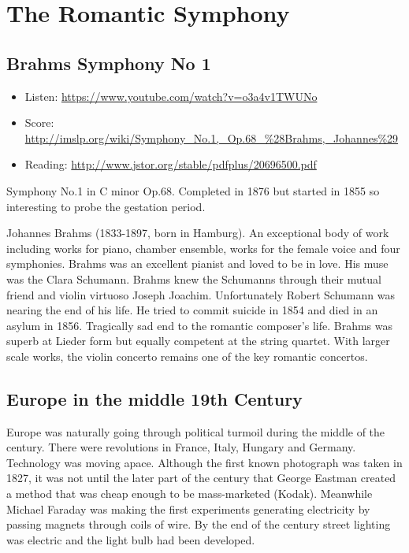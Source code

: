 
\chapter{The Romantic Symphony}
\label{romanticsymphony}


\section{Brahms Symphony No 1 }
\begin{itemize}
\item Listen: \url{https://www.youtube.com/watch?v=o3a4v1TWUNo}
\item Score: \url{http://imslp.org/wiki/Symphony_No.1,_Op.68_%28Brahms,_Johannes%29}
\item Reading: \url{http://www.jstor.org/stable/pdfplus/20696500.pdf}
\end{itemize}

Symphony No.1 in C minor Op.68. Completed in 1876 but started in 1855 so interesting to probe the gestation period. 

Johannes Brahms (1833-1897, born in Hamburg). An exceptional body of work including works for piano, chamber ensemble, works for the female voice and four symphonies. Brahms was an excellent pianist and loved to be in love. His muse was the Clara Schumann. Brahms knew the Schumanns through their mutual friend and violin virtuoso Joseph Joachim. Unfortunately Robert Schumann was nearing the end of his life. He tried to commit suicide in 1854 and died in an asylum in 1856. Tragically sad end to the romantic composer's life. Brahms was superb at Lieder form but equally competent at the string quartet. With larger scale works, the violin concerto remains one of the key romantic concertos. 

\section{Europe in the middle 19th Century}
Europe was naturally going through political turmoil during the middle of the century. There were revolutions in France, Italy, Hungary and Germany. Technology was moving apace. Although the first known photograph was taken in 1827, it was not until the later part of the century that George Eastman created a method that was cheap enough to be mass-marketed (Kodak). Meanwhile Michael Faraday was making the first experiments generating electricity by passing magnets through coils of wire. By the end of the century street lighting was electric and the light bulb had been developed. 

